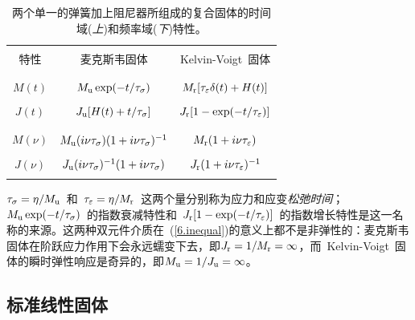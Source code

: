 \begin{table}
\centering
\begin{tabular}{|c|c|c|} \hline
&& \\
特性 & 麦克斯韦固体 & Kelvin-Voigt~固体 \\
&& \\ \hline
&& \\
$M(t)$  & $M_{\rm u}\exp(-t/\tau_{\sigma})$
& $M_{\rm r}[\tau_{\varepsilon}\delta(t)+H(t)]$ \\
&& \\
$J(t)$ & $J_{\rm u}[H(t)+t/\tau_{\sigma}]$
& $J_{\rm r}[1-\exp(-t/\tau_{\varepsilon})]$ \\
&& \\ \hline
&& \\
$M(\nu)$ & $M_{\rm u}(i\nu\tau_{\sigma})(1+i\nu\tau_{\sigma})^{-1}$ &
$M_{\rm r}(1+i\nu\tau_{\varepsilon})$ \\
&& \\
$J(\nu)$ & $J_{\rm u}(i\nu\tau_{\sigma})^{-1}(1+i\nu\tau_{\sigma})$ &
$J_{\rm r}(1+i\nu\tau_{\varepsilon})^{-1}$ \\
&& \\ \hline
\end{tabular}
\caption[M&Jdefns]{
两个单一的弹簧加上阻尼器所组成的复合固体的时间域({\em 上\/})和频率域({\em 下\/})特性。
}
\end{table}
$\tau_{\sigma}=\eta/M_{\rm u}$~和~$\tau_{\varepsilon}=\eta/M_{\rm r}$~这两个量分别称为应力和应变{\em 松弛时间\/}；
%
%
%
%
$M_{\rm u}\exp(-t/\tau_{\sigma})$~的指数衰减特性和~$J_{\rm r}[1-\exp(-t/\tau_{\varepsilon})]$~的指数增长特性是这一名称的来源。这两种双元件介质在~(\ref{6.inequal})的意义上都不是非弹性的：麦克斯韦固体在阶跃应力作用下会永远蠕变下去，即$J_{\rm r}=1/M_{\rm r}=\infty$，而~Kelvin-Voigt~固体的瞬时弹性响应是奇异的，即$M_{\rm u}=1/J_{\rm u}=\infty$。
%
%

\subsection{标准线性固体}
%

